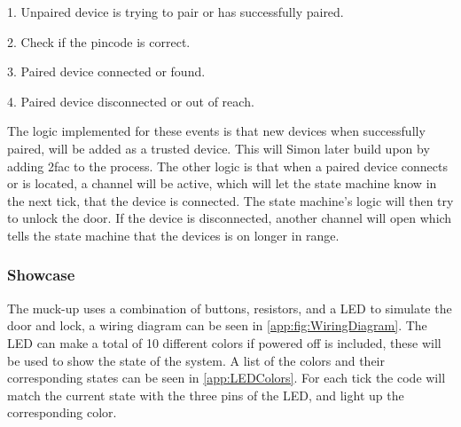 1. Unpaired device is trying to pair or has successfully paired.

2. Check if the pincode is correct.

3. Paired device connected or found.

4. Paired device disconnected or out of reach.
\newline

The logic implemented for these events is that new devices when successfully paired, will be added as a trusted device.
This will Simon later build upon by adding 2fac to the process.
The other logic is that when a paired device connects or is located, a channel will be active, which will let the state machine know in the next tick, that the device is connected.
The state machine's logic will then try to unlock the door.
If the device is disconnected, another channel will open which tells the state machine that the devices is on longer in range.

\subsubsection{Showcase}
The muck-up uses a combination of buttons, resistors, and a LED to simulate the door and lock, a wiring diagram can be seen in \ref{app:fig:WiringDiagram}.
The LED can make a total of 10 different colors if powered off is included,  these will be used to show the state of the system.
A list of the colors and their corresponding states can be seen in \ref{app:LEDColors}.
For each tick the code will match the current state with the three pins of the LED, and light up the corresponding color.